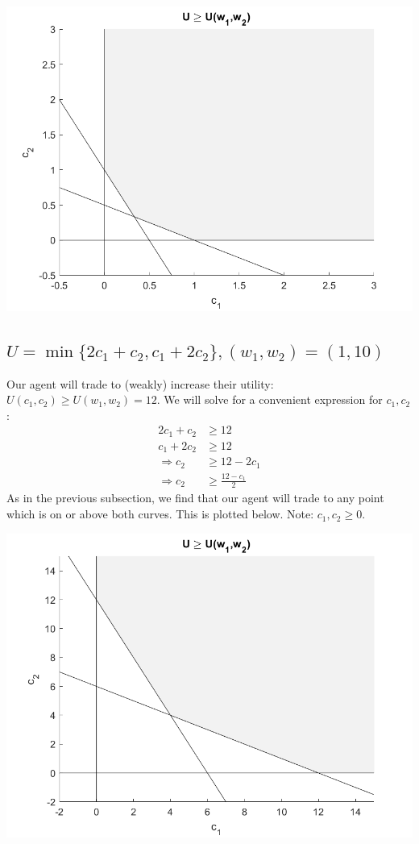 \documentclass[11pt]{article} %
\begin{document}
\includegraphics{p2}

\subsection{$U = \min \{ 2c_1 + c_2, c_1 + 2 c_2\}, (w_1,w_2) = (1,10)$}
Our agent will trade to (weakly) increase their utility: $U(c_1,c_2)\geq U(w_1,w_2) = 12$. We will solve for a convenient expression for $c_1,c_2$:
\begin{align*}
2c_1 + c_2 &\geq 12 \\
c_1 + 2c_2 &\geq 12 \\
\Rightarrow  c_2&\geq 12 - 2c_1 \\
\Rightarrow c_2&\geq \frac{12-c_1}{2}
\end{align*}
As in the previous subsection, we find that our agent will trade to any point which is on or above both curves. This is plotted below. Note: $c_1,c_2\geq 0.$

\includegraphics{p3}
\end{document}
